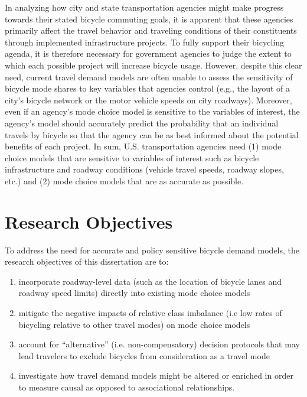 In analyzing how city and state transportation agencies might make progress towards their stated bicycle commuting goals, it is apparent that these agencies primarily affect the travel behavior and traveling conditions of their constituents through implemented infrastructure projects. To fully support their bicycling agenda, it is therefore necessary for government agencies to judge the extent to which each possible project will increase bicycle usage. However, despite this clear need, current travel demand models are often unable to assess the sensitivity of bicycle mode shares to key variables that agencies control (e.g., the layout of a city's bicycle network or the motor vehicle speeds on city roadways). Moreover, even if an agency's mode choice model is sensitive to the variables of interest, the agency's model should accurately predict the probability that an individual travels by bicycle so that the agency can be as best informed about the potential benefits of each project. In sum, U.S. transportation agencies need (1) mode choice models that are sensitive to variables of interest such as bicycle infrastructure and roadway conditions (vehicle travel speeds, roadway slopes, etc.) and (2) mode choice models that are as accurate as possible.

\section{Research Objectives}
\label{sec:research-objectives}
To address the need for accurate and policy sensitive bicycle demand models, the research objectives of this dissertation are to:

\begin{enumerate}
\item incorporate roadway-level data (such as the location of bicycle lanes and roadway speed limits) directly into existing mode choice models

\item mitigate the negative impacts of relative class imbalance (i.e low rates of bicycling relative to other travel modes) on mode choice models
\label{class_imbal_goal}

\item account for ``alternative'' (i.e. non-compensatory) decision protocols that may lead travelers to exclude bicycles from consideration as a travel mode

\item investigate how travel demand models might be altered or enriched in order to measure causal as opposed to associational relationships.
\end{enumerate}

